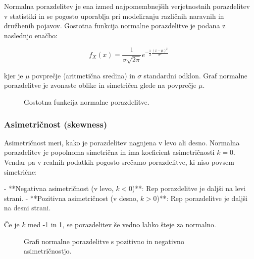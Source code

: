 Normalna porazdelitev je ena izmed najpomembnejših verjetnostnih porazdelitev v statistiki in se pogosto uporablja pri modeliranju različnih naravnih in družbenih pojavov. Gostotna funkcija normalne porazdelitve je podana z naslednjo enačbo:

\[ f_X(x) = \frac{1}{\sigma\sqrt{2\pi}} e^{-\frac{1}{2} \frac{(x-\mu)^2}{\sigma^2}} \]

kjer je $\mu$ povprečje (aritmetična sredina) in $\sigma$ standardni odklon. Graf normalne porazdelitve je zvonaste oblike in simetričen glede na povprečje $\mu$.

\begin{figure}
\centering
{}
\caption{Gostotna funkcija normalne porazdelitve.}
\end{figure}

\subsubsection*{Asimetričnost (skewness)}

Asimetričnost meri, kako je porazdelitev nagnjena v levo ali desno. Normalna porazdelitev je popolnoma simetrična in ima koeficient asimetričnosti $k = 0$. Vendar pa v realnih podatkih pogosto srečamo porazdelitve, ki niso povsem simetrične:

- **Negativna asimetričnost (v levo, $k < 0$)**: Rep porazdelitve je daljši na levi strani.
- **Pozitivna asimetričnost (v desno, $k > 0$)**: Rep porazdelitve je daljši na desni strani.

Če je $k$ med -1 in 1, se porazdelitev še vedno lahko šteje za normalno.

\begin{figure}
\centering
{}
\caption{Grafi normalne porazdelitve s pozitivno in negativno asimetričnostjo.}
\end{figure}

